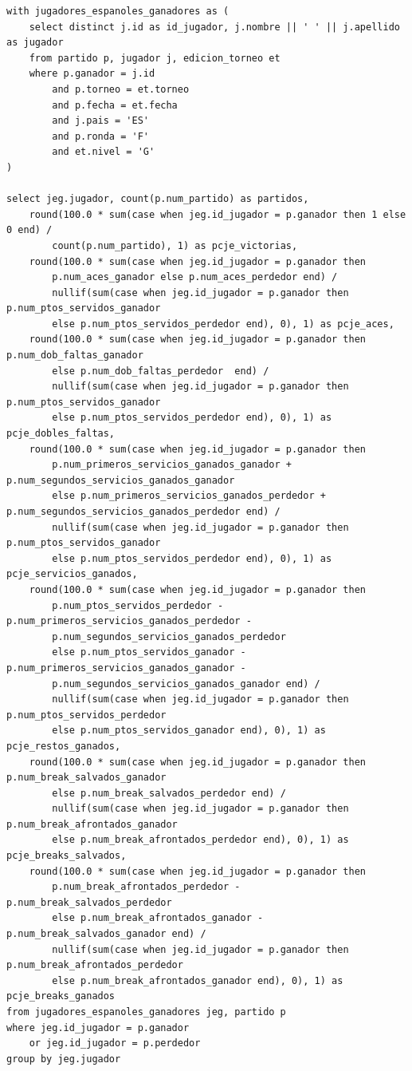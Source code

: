 \documentclass[11pt]{opticajnl}
\begin{document}
\begin{verbatim}
with jugadores_espanoles_ganadores as (
    select distinct j.id as id_jugador, j.nombre || ' ' || j.apellido as jugador
    from partido p, jugador j, edicion_torneo et 
    where p.ganador = j.id 
        and p.torneo = et.torneo 
        and p.fecha = et.fecha
        and j.pais = 'ES'
        and p.ronda = 'F'
        and et.nivel = 'G'
)

select jeg.jugador, count(p.num_partido) as partidos,
    round(100.0 * sum(case when jeg.id_jugador = p.ganador then 1 else 0 end) / 
		count(p.num_partido), 1) as pcje_victorias, 
    round(100.0 * sum(case when jeg.id_jugador = p.ganador then 
		p.num_aces_ganador else p.num_aces_perdedor end) / 
        nullif(sum(case when jeg.id_jugador = p.ganador then p.num_ptos_servidos_ganador 
		else p.num_ptos_servidos_perdedor end), 0), 1) as pcje_aces, 
    round(100.0 * sum(case when jeg.id_jugador = p.ganador then p.num_dob_faltas_ganador 
		else p.num_dob_faltas_perdedor  end) / 
        nullif(sum(case when jeg.id_jugador = p.ganador then p.num_ptos_servidos_ganador 
		else p.num_ptos_servidos_perdedor end), 0), 1) as pcje_dobles_faltas, 
    round(100.0 * sum(case when jeg.id_jugador = p.ganador then 
		p.num_primeros_servicios_ganados_ganador + p.num_segundos_servicios_ganados_ganador 
        else p.num_primeros_servicios_ganados_perdedor + p.num_segundos_servicios_ganados_perdedor end) / 
        nullif(sum(case when jeg.id_jugador = p.ganador then p.num_ptos_servidos_ganador 
		else p.num_ptos_servidos_perdedor end), 0), 1) as pcje_servicios_ganados, 
    round(100.0 * sum(case when jeg.id_jugador = p.ganador then 
		p.num_ptos_servidos_perdedor - p.num_primeros_servicios_ganados_perdedor - 
		p.num_segundos_servicios_ganados_perdedor 
        else p.num_ptos_servidos_ganador - p.num_primeros_servicios_ganados_ganador - 
		p.num_segundos_servicios_ganados_ganador end) / 
        nullif(sum(case when jeg.id_jugador = p.ganador then p.num_ptos_servidos_perdedor 
		else p.num_ptos_servidos_ganador end), 0), 1) as pcje_restos_ganados,
    round(100.0 * sum(case when jeg.id_jugador = p.ganador then p.num_break_salvados_ganador 
		else p.num_break_salvados_perdedor end) / 
        nullif(sum(case when jeg.id_jugador = p.ganador then p.num_break_afrontados_ganador 
		else p.num_break_afrontados_perdedor end), 0), 1) as pcje_breaks_salvados, 
    round(100.0 * sum(case when jeg.id_jugador = p.ganador then 
		p.num_break_afrontados_perdedor - p.num_break_salvados_perdedor 
        else p.num_break_afrontados_ganador - p.num_break_salvados_ganador end) / 
        nullif(sum(case when jeg.id_jugador = p.ganador then p.num_break_afrontados_perdedor 
		else p.num_break_afrontados_ganador end), 0), 1) as pcje_breaks_ganados
from jugadores_espanoles_ganadores jeg, partido p
where jeg.id_jugador = p.ganador 
	or jeg.id_jugador = p.perdedor
group by jeg.jugador
\end{verbatim}
\end{document}
